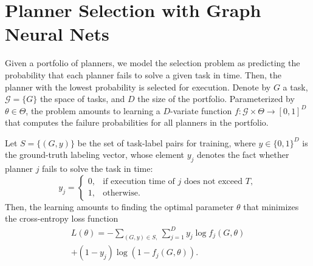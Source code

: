 \documentclass[letterpaper]{article} %
\begin{document}
\section{Planner Selection with Graph Neural Nets}
Given a portfolio of planners, we model the selection problem as predicting the probability that each planner fails to solve a given task in time. Then, the planner with the lowest probability is selected for execution. Denote by $G$ a task, $\mathcal{G}=\{G\}$ the space of tasks, and $D$ the size of the portfolio. Parameterized by $\theta\in\Theta$, the problem amounts to learning a $D$-variate function $f:\mathcal{G}\times\Theta\to[0,1]^D$ that computes the failure probabilities for all planners in the portfolio.

Let $S=\{(G,y)\}$ be the set of task-label pairs for training, where $y\in\{0,1\}^D$ is the ground-truth labeling vector, whose element $y_j$ denotes the fact whether planner $j$ fails to solve the task in time:
\begin{equation}\label{eqn:y}
y_j=\begin{cases}
0, & \text{if execution time of $j$ does not exceed $T$}, \\
1, & \text{otherwise}.
\end{cases}
\end{equation}
Then, the learning amounts to finding the optimal parameter $\theta$ that minimizes the cross-entropy loss function
\begin{multline*}
L(\theta)=-\sum_{(G,y)\in S,}\sum_{j=1}^D y_j\log f_j(G,\theta)\\
+(1-y_j)\log (1-f_j(G,\theta)).
\end{multline*}
\end{document}
